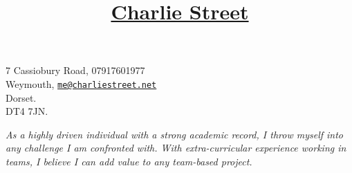 \documentclass[11pt]{article}
\title{\vspace{-80pt}\underline{Charlie Street}}
\date{}
\begin{document}
	\maketitle
	\vspace*{-60pt}
	\begin{flushleft}
	\noindent
	\large 7 Cassiobury Road,
	\hfill
	\large 07917601977 \\
	\large Weymouth,
	\hfill 
	\large \href{mailto:me@charliestreet.net}{\nolinkurl{me@charliestreet.net}} \\
	\large Dorset. \\
	\large DT4 7JN. \\
	\end{flushleft}

	\vspace{-15pt}
	\begin{center}
			\textit{\large As a highly driven individual with a strong academic record, I throw myself into any challenge I am confronted with. With extra-curricular experience working in teams, I believe I can add value to any team-based project.}
	\end{center}
			
\end{document}
